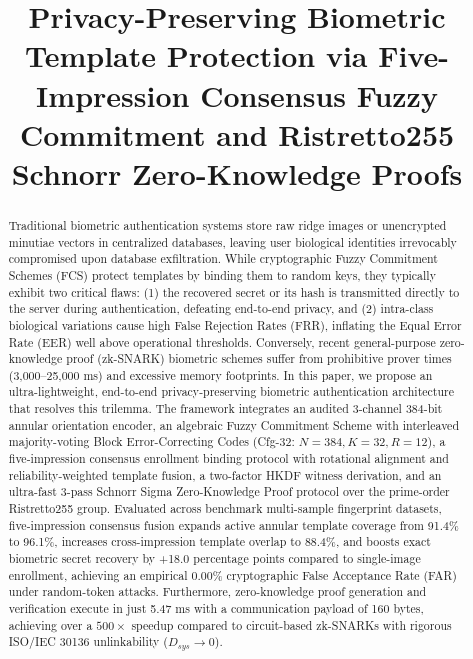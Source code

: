 \documentclass[conference]{IEEEtran}
\begin{document}
\title{Privacy-Preserving Biometric Template Protection via Five-Impression Consensus Fuzzy Commitment and Ristretto255 Schnorr Zero-Knowledge Proofs}

\author{
}

\maketitle

\begin{abstract}
Traditional biometric authentication systems store raw ridge images or unencrypted minutiae vectors in centralized databases, leaving user biological identities irrevocably compromised upon database exfiltration. While cryptographic Fuzzy Commitment Schemes (FCS) protect templates by binding them to random keys, they typically exhibit two critical flaws: (1) the recovered secret or its hash is transmitted directly to the server during authentication, defeating end-to-end privacy, and (2) intra-class biological variations cause high False Rejection Rates (FRR), inflating the Equal Error Rate (EER) well above operational thresholds. Conversely, recent general-purpose zero-knowledge proof (zk-SNARK) biometric schemes suffer from prohibitive prover times (3,000--25,000 ms) and excessive memory footprints. In this paper, we propose an ultra-lightweight, end-to-end privacy-preserving biometric authentication architecture that resolves this trilemma. The framework integrates an audited 3-channel 384-bit annular orientation encoder, an algebraic Fuzzy Commitment Scheme with interleaved majority-voting Block Error-Correcting Codes (Cfg-32: $N=384, K=32, R=12$), a five-impression consensus enrollment binding protocol with rotational alignment and reliability-weighted template fusion, a two-factor HKDF witness derivation, and an ultra-fast 3-pass Schnorr Sigma Zero-Knowledge Proof protocol over the prime-order Ristretto255 group. Evaluated across benchmark multi-sample fingerprint datasets, five-impression consensus fusion expands active annular template coverage from 91.4\% to 96.1\%, increases cross-impression template overlap to 88.4\%, and boosts exact biometric secret recovery by +18.0 percentage points compared to single-image enrollment, achieving an empirical 0.00\% cryptographic False Acceptance Rate (FAR) under random-token attacks. Furthermore, zero-knowledge proof generation and verification execute in just 5.47 ms with a communication payload of 160 bytes, achieving over a $500\times$ speedup compared to circuit-based zk-SNARKs with rigorous ISO/IEC 30136 unlinkability ($D_{sys} \to 0$).
\end{abstract}
\end{document}
